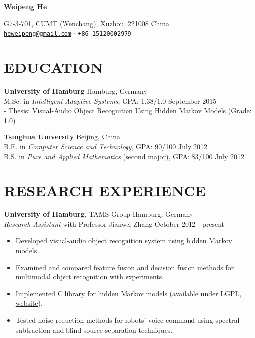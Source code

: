 \documentclass[a4paper,11pt]{article} %
\newcommand{\ind}{\hspace*{1em}}
\begin{document}
\thispagestyle{empty}


\begin{center}
  {\Huge\bfseries Weipeng He}

  G7-3-701, CUMT (Wenchang), Xuzhou, 221008 China \\
  \href{mailto:heweipeng@gmail.com}{\texttt{heweipeng@gmail.com}} $\cdotp$
  \texttt{+86 15120002979}
\end{center}


\section{EDUCATION}
\textbf{University of Hamburg} \hfill Hamburg, Germany \\
\ind M.Sc. in \textit{Intelligent Adaptive Systems}, GPA: 1.38/1.0  \hfill September 2015 \\
\ind - Thesis: Visual-Audio Object Recognition Using Hidden Markov Models (Grade: 1.0)

\textbf{Tsinghua University} \hfill Beijing, China \\
\ind B.E. in \textit{Computer Science and Technology}, GPA: 90/100 \hfill July 2012 \\
\ind B.S. in \textit{Pure and Applied Mathematics} (second major), GPA: 83/100 \hfill July 2012


\section{RESEARCH EXPERIENCE}

\textbf{University of Hamburg}, TAMS Group \hfill Hamburg, Germany \\
\textit{Research Assistant} with Professor Jianwei Zhang \hfill October 2012 - present
\vspace{-\parskip}
\begin{itemize}
  \item Developed visual-audio object recognition system using hidden Markov models.
  \item Examined and compared feature fusion and decision fusion methods for multimodal object recognition with experiments.
  \item Implemented C library for hidden Markov models (available under LGPL, \href{https://github.com/hwp/notGHMM}{website}).
  \item Tested noise reduction methods for robots' voice command using spectral subtraction and blind source separation techniques.
\end{itemize}
\end{document}
